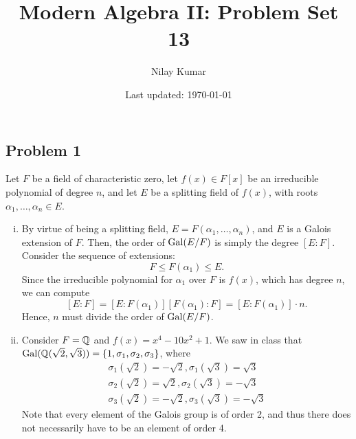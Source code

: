 \documentclass{../../mathnotes}
\title{Modern Algebra II: Problem Set 13}
\author{Nilay Kumar}
\date{Last updated: \today}
\begin{document}
\maketitle

\subsection*{Problem 1}
Let $F$ be a field of characteristic zero, let $f(x)\in F[x]$ be an irreducible polynomial
of degree $n$, and let $E$ be a splitting field of $f(x)$, with roots $\alpha_1,\ldots,\alpha_n\in E$.
\begin{enumerate}[(i)]
    \item By virtue of being a splitting field, $E=F(\alpha_1,\ldots,\alpha_n)$, and $E$ is a Galois
        extension of $F$. Then, the order of $\operatorname{Gal}(E/F)$ is simply the degree $[E:F]$. Consider
        the sequence of extensions:
        \[F\leq F(\alpha_1)\leq E.\]
        Since the irreducible polynomial for $\alpha_1$ over $F$ is $f(x)$, which has degree $n$, we
        can compute
        \[ [E:F]=[E:F(\alpha_1)][F(\alpha_1):F]=[E:F(\alpha_1)]\cdot n. \]
        Hence, $n$ must divide the order of $\operatorname{Gal}(E/F)$. 
    \item Consider $F=\mathbb{Q}$ and $f(x)=x^4-10x^2+1$. We saw in class that $\operatorname{Gal}(\mathbb{Q}(\sqrt{2},\sqrt{3}))=
        \left\{ 1, \sigma_1,\sigma_2,\sigma_3\right\}$, where 
        \begin{align*}
            \sigma_1(\sqrt{2})=-\sqrt{2},\sigma_1(\sqrt{3})=\sqrt{3}\\
            \sigma_2(\sqrt{2})=\sqrt{2},\sigma_2(\sqrt{3})=-\sqrt{3}\\
            \sigma_3(\sqrt{2})=-\sqrt{2},\sigma_3(\sqrt{3})=-\sqrt{3}
        \end{align*}
        Note that every element of the Galois group is of order 2, and thus there does not necessarily
        have to be an element of order 4.
\end{enumerate}
\end{document}
